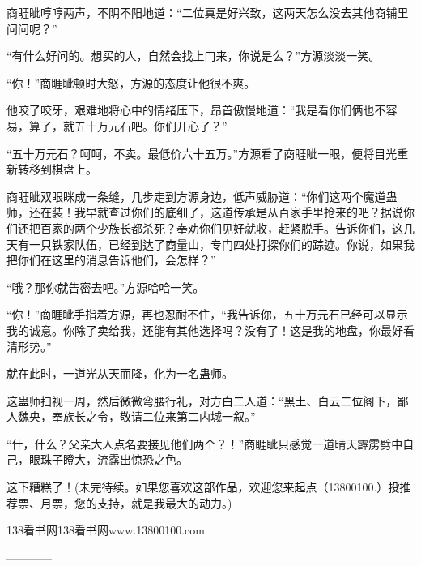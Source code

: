 \begin{this_body}
商睚眦哼哼两声，不阴不阳地道：“二位真是好兴致，这两天怎么没去其他商铺里问问呢？”

“有什么好问的。想买的人，自然会找上门来，你说是么？”方源淡淡一笑。

“你！”商睚眦顿时大怒，方源的态度让他很不爽。

他咬了咬牙，艰难地将心中的情绪压下，昂首傲慢地道：“我是看你们俩也不容易，算了，就五十万元石吧。你们开心了？”

“五十万元石？呵呵，不卖。最低价六十五万。”方源看了商睚眦一眼，便将目光重新转移到棋盘上。

商睚眦双眼眯成一条缝，几步走到方源身边，低声威胁道：“你们这两个魔道蛊师，还在装！我早就查过你们的底细了，这道传承是从百家手里抢来的吧？据说你们还把百家的两个少族长都杀死？奉劝你们见好就收，赶紧脱手。告诉你们，这几天有一只铁家队伍，已经到达了商量山，专门四处打探你们的踪迹。你说，如果我把你们在这里的消息告诉他们，会怎样？”

“哦？那你就告密去吧。”方源哈哈一笑。

“你！”商睚眦手指着方源，再也忍耐不住，“我告诉你，五十万元石已经可以显示我的诚意。你除了卖给我，还能有其他选择吗？没有了！这是我的地盘，你最好看清形势。”

就在此时，一道光从天而降，化为一名蛊师。

这蛊师扫视一周，然后微微弯腰行礼，对方白二人道：“黑土、白云二位阁下，鄙人魏央，奉族长之令，敬请二位来第二内城一叙。”

“什，什么？父亲大人点名要接见他们两个？！”商睚眦只感觉一道晴天霹雳劈中自己，眼珠子瞪大，流露出惊恐之色。

这下糟糕了！(未完待续。如果您喜欢这部作品，欢迎您来起点（13800100.）投推荐票、月票，您的支持，就是我最大的动力。)

138看书网138看书网www.13800100.com

------------

\end{this_body}

